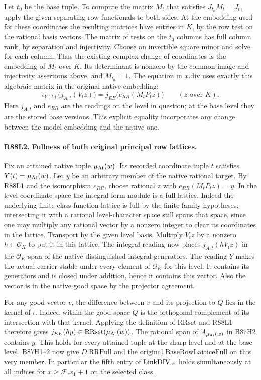 Let $t_0$ be the base tuple. To compute the matrix $M_t$ that
satisfies $J_{t_0}M_t=J_t$, apply the given separating row
functionals to both sides. At the embedding used for these
coordinates the resulting matrices have entries in $K$, by the
row test on the rational basis vectors. The matrix of tests on the
$t_0$ columns has full column rank, by separation and injectivity.
Choose an invertible square minor and solve for each column.
Thus the existing complex change of coordinates is the embedding
of $M_t$ over $K$. Its determinant is nonzero by the common-image
and injectivity assertions above, and $M_{t_0}=1$.
The equation in $x.\mathrm{div}$ uses exactly this algebraic
matrix in the original native embedding:
\[
 \iota_{Y(t)}\big(j_{A,t}(V_tz)\big)
       = j_{EE}\big(e_{RR}(M_tP_tz)\big)\qquad(z\text{ over } K).
\]
Here $j_{A,t}$ and $e_{RR}$ are the readings on the level in
question; at the base level they are the stored base versions.
This explicit equality incorporates any change between the model
embedding and the native one.

\paragraph{R88L2. Fullness of both original principal row lattices.}
Fix an attained native tuple $\mu_{\rm At}(w)$. Its recorded
coordinate tuple $t$ satisfies $Y(t)=\mu_{\rm At}(w)$.
Let $y$ be an arbitrary member of the native rational target.
By R88L1 and the isomorphism $e_{RR}$, choose rational $z$ with
$e_{RR}(M_tP_tz)=y$. In the level coordinate space the integral
form module is a full lattice. Indeed the underlying finite
class-function lattice is full by the finite-family hypotheses;
intersecting it with a rational level-character space still spans
that space, since one may multiply any rational vector by a
nonzero integer to clear its coordinates in the lattice. Transport
by the given level basis. Multiply $V_tz$ by a nonzero
$h\in\mathcal O_K$ to put it in this lattice. The integral
reading now places $j_{A,t}(hV_tz)$ in the $\mathcal O_K$-span
of the native distinguished integral generators. The reading $Y$
makes the actual carrier stable under every element of
$\mathcal O_K$ for this level. It contains its generators and is
closed under addition, hence it contains this vector. Also the
vector is in the native good space by the projector agreement.

For any good vector $v$, the difference between $v$ and its
projection to $Q$ lies in the kernel of $\iota$. Indeed within the
good space $Q$ is the orthogonal complement of its intersection with
that kernel. Applying the definition of $\mathrm{RRset}$ and R88L1
therefore gives $j_{EE}(hy)\in\mathrm{RRset}(\mu_{\rm At}(w))$.
The rational span of $A_{\mu_{\rm At}(w)}$ in B87H2 contains $y$.
This holds for every attained tuple at the sharp level and at the
base level. B87H1--2 now give $D.\mathrm{RRFull}$ and the original
$\mathrm{BaseRowLatticeFull}$ on this very member. In particular
the fifth entry of $\mathrm{LinkDIV}_{\rm at}$ holds simultaneously
at all indices for $x\ge\mathcal F.x_1+1$ on the selected class.

